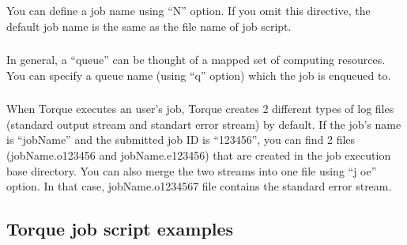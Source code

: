 \documentclass[a4paper,11pt,english]{sphinxmanual}
\begin{document}
\subsubsection{}
\label{\detokenize{guide:job-name}}
\sphinxAtStartPar
You can define a job name using “\sphinxhyphen{}N” option. If you omit this directive, the default job name is the same as the file name of job script.

\begin{sphinxVerbatim}[commandchars=\\\{\}]
\end{sphinxVerbatim}


\subsubsection{}
\label{\detokenize{guide:queue-name}}
\sphinxAtStartPar
In general, a “queue” can be thought of a mapped set of computing resources. You can specify a queue name (using “\sphinxhyphen{}q” option) which the job is enqueued to.

\begin{sphinxVerbatim}[commandchars=\\\{\}]
\end{sphinxVerbatim}


\subsubsection{}
\label{\detokenize{guide:job-log-files}}
\sphinxAtStartPar
When Torque executes an user’s job, Torque creates 2 different types of log files (standard output stream and standart error stream) by default. If the job’s name is “jobName” and the submitted job ID is “123456”, you can find 2 files (jobName.o123456 and jobName.e123456) that are created in the job execution base directory.
You can also merge the two streams into one file using “\sphinxhyphen{}j oe” option. In that case, jobName.o1234567 file contains the standard error stream.

\begin{sphinxVerbatim}[commandchars=\\\{\}]
\end{sphinxVerbatim}


\subsection{Torque job script examples}
\label{\detokenize{guide:torque-job-script-examples}}
\end{document}
